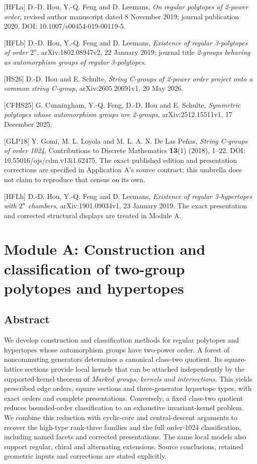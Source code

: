\documentclass[
  11pt,
  a4paper,
]{article}
\begin{document}
{[}HFLa{]} D.-D. Hou, Y.-Q. Feng and D. Leemans, \emph{On regular
polytopes of 2-power order}, revised author manuscript dated 8 November
2019; journal publication 2020. DOI: 10.1007/s00454-019-00119-5.

{[}HFLb{]} D.-D. Hou, Y.-Q. Feng and D. Leemans, \emph{Existence of
regular 3-polytopes of order \(2^n\)}, arXiv:1802.08947v2, 22 January
2019; journal title \emph{2-groups behaving as automorphism groups of
regular 3-polytopes}.

{[}HS26{]} D.-D. Hou and E. Schulte, \emph{String C-groups of 2-power
order project onto a common string C-group}, arXiv:2605.20691v1, 20 May
2026.

{[}CFHS25{]} G. Cunningham, Y.-Q. Feng, D.-D. Hou and E. Schulte,
\emph{Symmetric polytopes whose automorphism groups are 2-groups},
arXiv:2512.15511v1, 17 December 2025.

{[}GLP18{]} Y. Gomi, M. L. Loyola and M. L. A. N. De Las Peñas,
\emph{String C-groups of order 1024}, Contributions to Discrete
Mathematics \textbf{13}(1) (2018), 1--22. DOI:
10.55016/ojs/cdm.v13i1.62475. The exact published edition and
presentation corrections are specified in Application A's source
contract; this umbrella does not claim to reproduce that census on its
own.

{[}HFLh{]} D.-D. Hou, Y.-Q. Feng and D. Leemans, \emph{Existence of
regular 3-hypertopes with \(2^n\) chambers}, arXiv:1901.09034v1, 23
January 2019. The exact presentation and corrected structural displays
are treated in Module A.

\section{Module A: Construction and classification of two-group
polytopes and
hypertopes}\label{module-a-construction-and-classification-of-two-group-polytopes-and-hypertopes}

\subsection{Abstract}\label{abstract-1}

We develop construction and classification methods for regular polytopes
and hypertopes whose automorphism groups have two-power order. A forest
of noncommuting generators determines a canonical class-two quotient.
Its square-lattice sections provide local kernels that can be attached
independently by the supported-kernel theorem of \emph{Marked groups,
kernels and intersections}. This yields prescribed edge orders, square
sections and three-generator hypertope types, with exact orders and
complete presentations. Conversely, a fixed class-two quotient reduces
bounded-order classification to an exhaustive invariant-kernel problem.
We combine this reduction with cyclic-core and central-descent arguments
to recover the high-type rank-three families and the full order-1024
classification, including named facets and corrected presentations. The
same local models also support regular, chiral and alternating
extensions. Source conclusions, retained geometric inputs and
corrections are stated explicitly.
\end{document}
